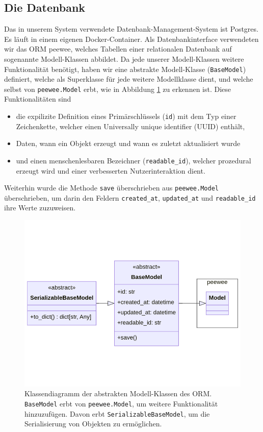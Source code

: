 \subsection{Die Datenbank}

Das in unserem System verwendete Datenbank-Management-System ist Postgres. Es läuft in einem eigenen Docker-Container. Als Datenbankinterface verwendeten wir das ORM peewee, welches Tabellen einer relationalen Datenbank auf sogenannte Modell-Klassen abbildet. Da jede unserer Modell-Klassen weitere Funktionalität benötigt, haben wir eine abstrakte Modell-Klasse (\texttt{BaseModel}) definiert, welche als Superklasse für jede weitere Modellklasse dient, und welche selbst von \texttt{peewee.Model} erbt, wie in Abbildung \ref{fig:database-class} zu erkennen ist. Diese Funktionalitäten sind 
\begin{itemize}
	\item die expilizite Definition eines Primärschlüssels (\texttt{id}) mit dem Typ einer Zeichenkette, welcher einen Universally unique identifier (UUID) enthält,
	\item Daten, wann ein Objekt erzeugt und wann es zuletzt aktualisiert wurde
	\item und einen menschenlesbaren Bezeichner (\texttt{readable\_id}), welcher prozedural erzeugt wird und einer verbesserten Nutzerinteraktion dient.
\end{itemize}
Weiterhin wurde die Methode \texttt{save} überschrieben aus \texttt{peewee.Model} überschrieben, um darin den Feldern \texttt{created\_at}, \texttt{updated\_at} und \texttt{readable\_id} ihre Werte zuzuweisen.

\begin{figure}[!hb]
	\centering
	\includegraphics[width=0.75\linewidth]{images/diagrams/database-class.png}
	\caption{Klassendiagramm der abstrakten Modell-Klassen des ORM. \texttt{BaseModel} erbt von \texttt{peewee.Model}, um weitere Funktionalität hinzuzufügen. Davon erbt \texttt{SerializableBaseModel}, um die Serialisierung von Objekten zu ermöglichen.}
	\label{fig:database-class}
\end{figure}

